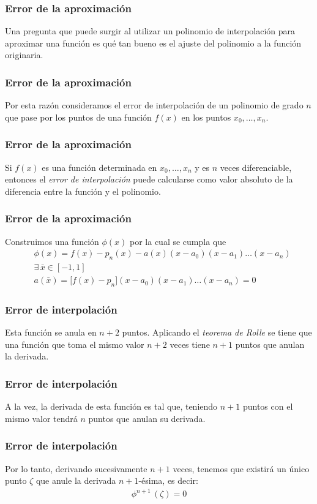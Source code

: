 \begin{frame}
\frametitle{Error de la aproximación}
Una pregunta que puede surgir al utilizar un polinomio de interpolación para aproximar una función es qué tan bueno es el ajuste del polinomio a la función originaria.
\end{frame}
\begin{frame}
\frametitle{Error de la aproximación}
Por esta razón consideramos el error de interpolación de un polinomio de grado $n$ que pase por los puntos de una función $f(x)$ en los puntos $x_{0}, \ldots, x_{n}$.
\end{frame}
\begin{frame}
\frametitle{Error de la aproximación}
Si $f(x)$ es una función determinada en $x_{0}, \ldots, x_{n}$ y es $n$ veces diferenciable, entonces el \emph{error de interpolación} puede calcularse como valor absoluto de la diferencia entre la función y el polinomio.
\end{frame}
\begin{frame}
\frametitle{Error de la aproximación}
Construimos una función $\phi(x)$ por la cual se cumpla que
\begin{align*}
&\phi(x) = f(x) {-} p_{n}(x) {-} a(x)(x {-} a_{0})(x {-} a_{1}) \ldots (x {-} a_{n}) \\[0.5em]
&\exists \, \bar{x} \in [-1, 1] \\[0.5em]
&a(\bar{x}) = \big[ f(x) {-} p_{n} \big] (x {-} a_{0})(x {-} a_{1}) \ldots (x {-} a_{n}) = 0
\end{align*}
\end{frame}
\begin{frame}
\frametitle{Error de interpolación}
Esta función se anula en $n + 2$ puntos. Aplicando el \emph{teorema de Rolle} se tiene que una función que toma el mismo valor $n + 2$ veces tiene $n + 1$ puntos que anulan la derivada.
\end{frame}
\begin{frame}
\frametitle{Error de interpolación}
A la vez, la derivada de esta función es tal que, teniendo $n + 1$ puntos con el mismo valor tendrá $n$ puntos que anulan su derivada. 
\end{frame}
\begin{frame}
\frametitle{Error de interpolación}
Por lo tanto, derivando sucesivamente $n + 1$ veces, tenemos que existirá un único punto $\zeta$ que anule la derivada $n+1$-ésima, es decir:
\begin{align*}
\phi^{n+1} \, (\zeta) = 0
\end{align*}
\end{frame}
